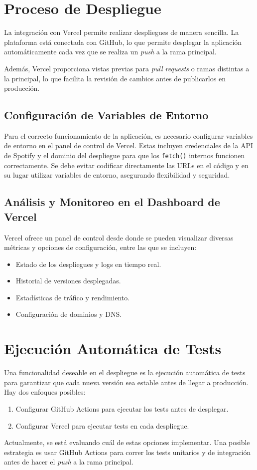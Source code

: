 \section{Proceso de Despliegue}
La integración con Vercel permite realizar despliegues de manera sencilla. La plataforma está conectada con GitHub, lo que permite desplegar la aplicación automáticamente cada vez que se realiza un \textit{push} a la rama principal.

Además, Vercel proporciona vistas previas para \textit{pull requests} o ramas distintas a la principal, lo que facilita la revisión de cambios antes de publicarlos en producción.

\subsection{Configuración de Variables de Entorno}
Para el correcto funcionamiento de la aplicación, es necesario configurar variables de entorno en el panel de control de Vercel. Estas incluyen credenciales de la API de Spotify y el dominio del despliegue para que los \texttt{fetch()} internos funcionen correctamente. Se debe evitar codificar directamente las URLs en el código y en su lugar utilizar variables de entorno, asegurando flexibilidad y seguridad.

\subsection{Análisis y Monitoreo en el Dashboard de Vercel}
Vercel ofrece un panel de control desde donde se pueden visualizar diversas métricas y opciones de configuración, entre las que se incluyen:
\begin{itemize}
    \item Estado de los despliegues y logs en tiempo real.
    \item Historial de versiones desplegadas.
    \item Estadísticas de tráfico y rendimiento.
    \item Configuración de dominios y DNS.
\end{itemize}

\section{Ejecución Automática de Tests}
Una funcionalidad deseable en el despliegue es la ejecución automática de tests para garantizar que cada nueva versión sea estable antes de llegar a producción. Hay dos enfoques posibles:
\begin{enumerate}
    \item Configurar GitHub Actions para ejecutar los tests antes de desplegar.
    \item Configurar Vercel para ejecutar tests en cada despliegue.
\end{enumerate}
Actualmente, se está evaluando cuál de estas opciones implementar. Una posible estrategia es usar GitHub Actions para correr los tests unitarios y de integración antes de hacer el \textit{push} a la rama principal.
